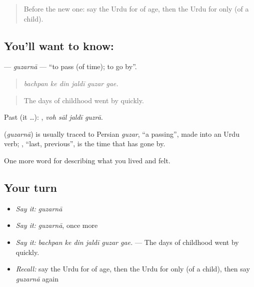 \label{lesson:UR-C486-guzarna-pass}



\begin{quote}
Before the new one: say the Urdu for of age, then the Urdu for only (of a child).
\end{quote}

\subsection*{You'll want to know: }
\textbf{} — \emph{guzarnā} — \textquotedblleft{}to pass (of time); to go by\textquotedblright{}.

\begin{quote}
     
\end{quote}

\begin{quote}
\emph{bachpan ke din jaldī guzar gae.}
\end{quote}

\begin{quote}
The days of childhood went by quickly.
\end{quote}

Past (it …):    , \emph{voh sāl jaldī guzrā}.

\begin{cousinweb}
\textbf{} (\emph{guzarnā}) is usually traced to Persian \emph{guzar}, \textquotedblleft{}a passing\textquotedblright{}, made into an Urdu verb; \textbf{}, \textquotedblleft{}last, previous\textquotedblright{}, is the time that has gone by.
\end{cousinweb}

\begin{grammarlens}[title={What you've built}]
One more word for describing what you lived and felt.
\end{grammarlens}

\subsection*{Your turn}
\begin{itemize}
\raggedright
  \item \emph{Say it:} \emph{guzarnā}
  \item \emph{Say it:} \emph{guzarnā}, once more
  \item \emph{Say it:} \emph{bachpan ke din jaldī guzar gae.} — The days of childhood went by quickly.
  \item \emph{Recall:} say the Urdu for of age, then the Urdu for only (of a child), then say \emph{guzarnā} again
\end{itemize}

